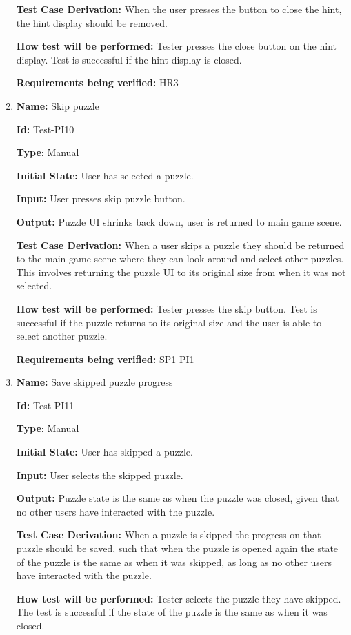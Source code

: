 \documentclass[12pt, titlepage]{article}
\begin{document}
\begin{enumerate}
\textbf{Test Case Derivation:}
When the user presses the button to close the hint, the hint display should be removed.

\textbf{How test will be performed:}
Tester presses the close button on the hint display. Test is successful if the hint display is closed.

\textbf{Requirements being verified: } HR3

\item{\textbf{Name:} Skip puzzle}

\textbf{Id:} Test-PI10

\textbf{Type}: Manual

\textbf{Initial State:} User has selected a puzzle.

\textbf{Input:} User presses skip puzzle button.

\textbf{Output:} Puzzle UI shrinks back down, user is returned to main game scene.

\textbf{Test Case Derivation:}
When a user skips a puzzle they should be returned to the main game scene where they can look around and select other puzzles. This involves returning the puzzle UI to its original size from when it was not selected.

\textbf{How test will be performed:}
Tester presses the skip button. Test is successful if the puzzle returns to its original size and the user is able to select another puzzle.

\textbf{Requirements being verified: } SP1 PI1

\item{\textbf{Name:} Save skipped puzzle progress}

\textbf{Id:} Test-PI11

\textbf{Type}: Manual

\textbf{Initial State:} User has skipped a puzzle.

\textbf{Input:} User selects the skipped puzzle.

\textbf{Output:} Puzzle state is the same as when the puzzle was closed, given that no other users have interacted with the puzzle.

\textbf{Test Case Derivation:}
When a puzzle is skipped the progress on that puzzle should be saved, such that when the puzzle is opened again the state of the puzzle is the same as when it was skipped, as long as no other users have interacted with the puzzle.

\textbf{How test will be performed:}
Tester selects the puzzle they have skipped. The test is successful if the state of the puzzle is the same as when it was closed.


\end{enumerate}
\end{document}

